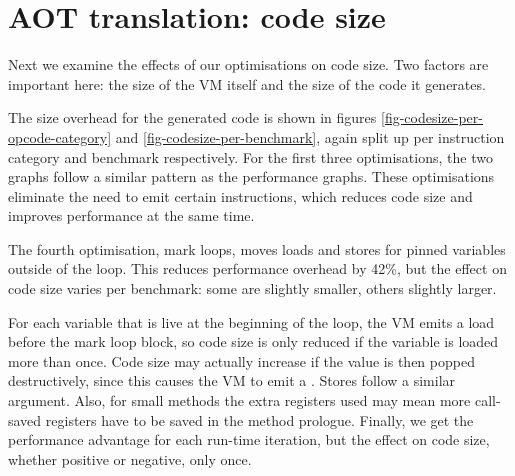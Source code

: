 

\section{AOT translation: code size}
\label{sec-evaluation-aot-translation-code-size}
Next we examine the effects of our optimisations on code size. Two factors are important here: the size of the VM itself and the size of the code it generates.

The size overhead for the generated code is shown in figures \ref{fig-codesize-per-opcode-category} and \ref{fig-codesize-per-benchmark}, again split up per instruction category and benchmark respectively. For the first three optimisations, the two graphs follow a similar pattern as the performance graphs. These optimisations eliminate the need to emit certain instructions, which reduces code size and improves performance at the same time.

The fourth optimisation, mark loops, moves loads and stores for pinned variables outside of the loop. This reduces performance overhead by 42\%, but the effect on code size varies per benchmark: some are slightly smaller, others slightly larger.

For each variable that is live at the beginning of the loop, the VM emits a load before the mark loop block, so code size is only reduced if the variable is loaded more than once. Code size may actually increase if the value is then popped destructively, since this causes the VM to emit a . Stores follow a similar argument. Also, for small methods the extra registers used may mean more call-saved registers have to be saved in the method prologue. Finally, we get the performance advantage for each run-time iteration, but the effect on code size, whether positive or negative, only once.


